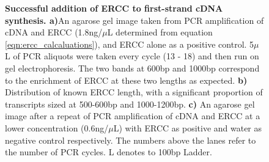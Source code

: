 \begin{figure}[!htp]
\begin{center}
	\end{center}
	\captionsetup{width=0.95\textwidth}
	\caption[ERCC usage to benchmark library preparation and sequencing performance runs]%
	{\textbf{Successful addition of ERCC to first-strand cDNA synthesis. a)}An agarose gel image taken from PCR amplification of cDNA and ERCC (1.8ng/$\mu$L determined from equation \ref{eqn:ercc_calcaluations}), and ERCC alone as a positive control. 5$\mu$L of PCR aliquots were taken every cycle (13 - 18) and then run on gel electrophoresis. The two bands at 600bp and 1000bp correspond to the enrichment of ERCC at these two lengths as expected. \textbf{b)} Distribution of known ERCC length, with a significant proportion of transcripts sized at 500-600bp and 1000-1200bp. \textbf{c)} An agarose gel image after a repeat of PCR amplification of cDNA and ERCC at a lower concentration (0.6ng/$\mu$L) with ERCC as positive and water as negative control respectively. The numbers above the lanes refer to the number of PCR cycles. L denotes to 100bp Ladder.}
	\label{fig:ercc_lab_gel}
\end{figure}
 
